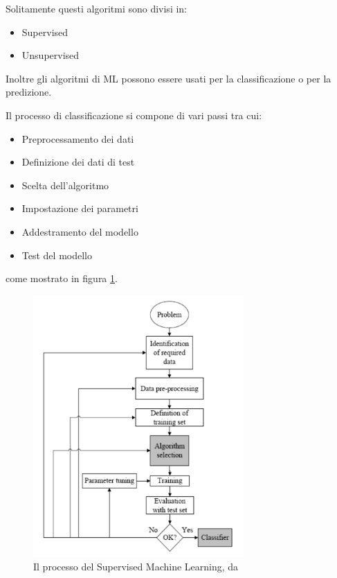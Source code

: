 Solitamente questi algoritmi sono divisi in:

\begin{itemize}
    \item Supervised
    \item Unsupervised 
\end{itemize}

Inoltre gli algoritmi di ML possono essere usati per la classificazione o per la predizione.

Il processo di classificazione si compone di vari passi tra cui:

\begin{itemize}
    \item Preprocessamento dei dati
    \item Definizione dei dati di test
    \item Scelta dell'algoritmo
    \item Impostazione dei parametri
    \item Addestramento del modello
    \item Test del modello
\end{itemize}

come mostrato in figura \ref{fig:ml_process}.

\begin{figure}[htpb]
    \centering
    \includegraphics[width=\textwidth,height=10cm,keepaspectratio=true]{img/ml_process.png}
    \caption{
        Il processo del Supervised Machine Learning, da \cite{babcockuniversitySupervisedMachineLearning2017}
    }
    \label{fig:ml_process}
\end{figure}


